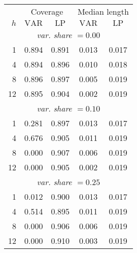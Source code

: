 \begin{tabular}{r|cc|cc}
& \multicolumn{2}{c|}{Coverage} & \multicolumn{2}{c}{Median length} \\
$h$ & $\text{VAR}$ & $\text{LP}$ & $\text{VAR}$ & $\text{LP}$ \\
\hline
\multicolumn{5}{c}{\emph{var. share $= 0.00$}} \\
  1 & 0.894 & 0.891 & 0.013 & 0.017 \\
  4 & 0.894 & 0.896 & 0.010 & 0.018 \\
  8 & 0.896 & 0.897 & 0.005 & 0.019 \\
 12 & 0.895 & 0.904 & 0.002 & 0.019 \\
\multicolumn{5}{c}{\emph{var. share $= 0.10$}} \\
  1 & 0.281 & 0.897 & 0.013 & 0.017 \\
  4 & 0.676 & 0.905 & 0.011 & 0.019 \\
  8 & 0.000 & 0.907 & 0.006 & 0.019 \\
 12 & 0.000 & 0.905 & 0.002 & 0.019 \\
\multicolumn{5}{c}{\emph{var. share $= 0.25$}} \\
  1 & 0.012 & 0.900 & 0.013 & 0.017 \\
  4 & 0.514 & 0.895 & 0.011 & 0.019 \\
  8 & 0.000 & 0.906 & 0.006 & 0.019 \\
 12 & 0.000 & 0.910 & 0.003 & 0.019 \\
\end{tabular}